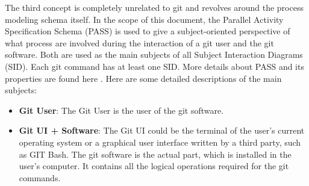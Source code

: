 The third concept is completely unrelated to git and revolves around the process modeling schema itself. In the scope of this document, the Parallel Activity Specification Schema (PASS) is used to give a subject-oriented perspective of what process are involved during the interaction of a git user and the git software. Both are used as the main subjects of all Subject Interaction Diagrams (SID). Each git command has at least one SID. More details about PASS and its properties are found here \cite{El21}.
Here are some detailed descriptions of the main subjects:
\begin{itemize} [nosep]
    \item \textbf{Git User}: The Git User is the user of the git software.
    \item \textbf{Git UI + Software}: The Git UI could be the terminal of the user's current operating system or a graphical user interface written by a third party, such as GIT Bash. The git software is the actual part, which is installed in the user's computer. It contains all the logical operations required for the git commands.
\end{itemize}

